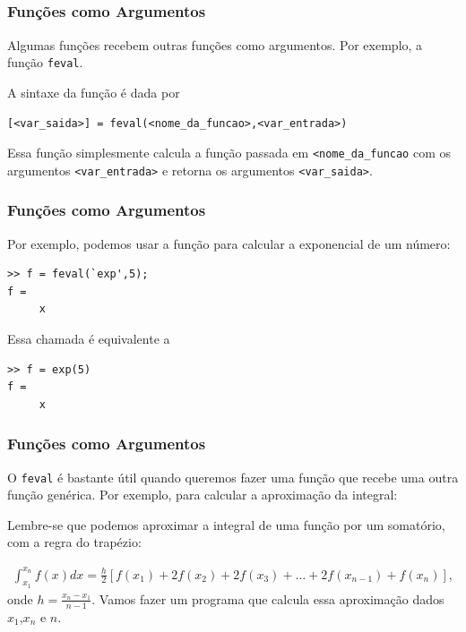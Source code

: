 \documentclass{beamer}
\begin{document}
\subsection[Fun\c{c}\~oes como Argumentos]{}

\begin{frame}[fragile]
\frametitle {Fun\c{c}\~oes como Argumentos}

Algumas fun\c{c}\~oes recebem outras fun\c{c}\~oes como argumentos. Por exemplo, a fun\c{c}\~ao {\tt feval}.
\pause

A sintaxe da fun\c{c}\~ao \'e dada por
\begin{verbatim}
[<var_saida>] = feval(<nome_da_funcao>,<var_entrada>)
\end{verbatim}
\pause

Essa fun\c{c}\~ao simplesmente calcula a fun\c{c}\~ao passada em {\tt <nome\_da\_funcao} com os argumentos  {\tt <var\_entrada>} e retorna os argumentos {\tt <var\_saida>}.

\end{frame}

\begin{frame}[fragile]
\frametitle {Fun\c{c}\~oes como Argumentos}

Por exemplo, podemos usar a fun\c{c}\~ao para calcular a exponencial de um n\'umero:
\pause 
\begin{verbatim}
>> f = feval(`exp',5);
f = 
     x
\end{verbatim}
\pause

Essa chamada \'e equivalente a
\pause

\begin{verbatim}
>> f = exp(5)
f =
     x
\end{verbatim}

\end{frame}

\begin{frame}
\frametitle {Fun\c{c}\~oes como Argumentos}

O {\tt feval} \'e bastante \'util quando queremos fazer uma fun\c{c}\~ao que recebe uma outra fun\c{c}\~ao gen\'erica. Por exemplo, para calcular a aproxima\c{c}\~ao da integral:
\pause

Lembre-se que podemos aproximar a integral de uma fun\c{c}\~ao por um somat\'orio, com a regra do trap\'ezio:
\pause

{\scriptsize
\begin{eqnarray*}
 \int_{x_1}^{x_n} f(x) dx = \frac{h}{2}[f(x_1)+2f(x_2)+2f(x_3)+\dots+2f(x_{n-1})+f(x_n)],
\end{eqnarray*}
}
onde $h = \frac{x_n-x_1}{n-1}$. Vamos fazer um programa que calcula essa aproxima\c{c}\~ao dados $x_1$,$x_n$ e $n$.

\end{frame}
\end{document}
